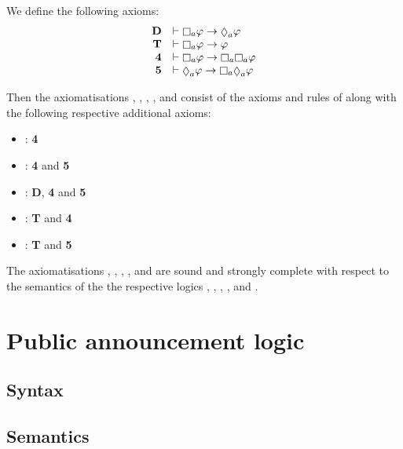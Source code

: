 \begin{definition}
We define the following axioms:
$$
\begin{array}{rl}
    {\bf D}     & \proves \necessary[\agentA] \phi \implies \possible[\agentA] \phi\\
    {\bf T}     & \proves \necessary[\agentA] \phi \implies \phi\\
    {\bf 4}     & \proves \necessary[\agentA] \phi \implies \necessary[\agentA] \necessary[\agentA] \phi\\
    {\bf 5}     & \proves \possible[\agentA] \phi \implies \necessary[\agentA] \possible[\agentA] \phi
\end{array}
$$

Then the axiomatisations \axiomKF{}, \axiomKFF{}, \axiomKD{}, \axiomSF{}, and \axiomS{} consist of the axioms and rules of \axiomK{} along with the following respective additional axioms:
\begin{itemize}
    \item \axiomKF{}: {\bf 4}
    \item \axiomKFF{}: {\bf 4} and {\bf 5}
    \item \axiomKD{}: {\bf D}, {\bf 4} and {\bf 5}
    \item \axiomSF{}: {\bf T} and {\bf 4}
    \item \axiomS{}: {\bf T} and {\bf 5}
\end{itemize}
\end{definition}

\begin{proposition}
The axiomatisations \axiomKF{}, \axiomKFF{}, \axiomKD{}, \axiomSF{}, and \axiomS{} are sound and strongly complete with respect to the semantics of the the respective logics \logicKF{}, \logicKFF{}, \logicKD{}, \logicSF{}, and \logicS{}.
\end{proposition}

\section{Public announcement logic}

\subsection{Syntax}

\subsection{Semantics}

